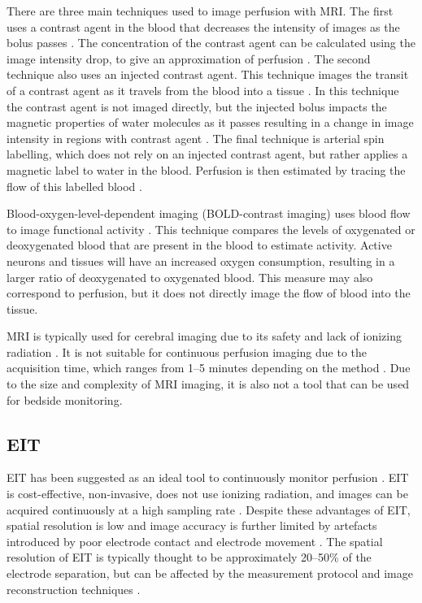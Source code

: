 There are three main techniques used to image perfusion with
MRI. The first uses a contrast agent in the blood that 
decreases the intensity
of  
images as the bolus passes \parencite{jackson_dynamic_2005}.  
The concentration of the contrast agent 
can be calculated using the image intensity drop, to give
an approximation of 
perfusion \parencite{jackson_dynamic_2005}. 
The second technique also uses an injected contrast
agent. This technique images the transit of a contrast agent as it travels 
from the blood into a tissue \parencite{sourbron_classic_2013}. In this technique the contrast
agent is not imaged directly, but the injected bolus impacts the magnetic properties of 
water molecules as it passes resulting in a change in image intensity in regions 
with contrast agent \parencite{sourbron_classic_2013}. 
The final technique is arterial spin labelling, which does not rely on 
an injected contrast agent, but rather applies a  magnetic label to water 
in the blood. Perfusion is then estimated by tracing the flow of this labelled 
blood \parencite{koretsky_early_2012}. 

Blood-oxygen-level-dependent imaging (BOLD-contrast imaging) uses blood flow to 
image functional activity \parencite{faro_functional_2006}.
This technique compares the levels of oxygenated or deoxygenated blood
that are present in the blood to estimate activity. 
Active neurons and tissues will have an increased oxygen consumption, 
resulting in a larger ratio of deoxygenated to oxygenated blood. 
This measure may also correspond to perfusion, but it does not directly image the 
flow of blood into the tissue.

MRI is typically used for cerebral imaging due to its safety and 
lack of ionizing radiation \parencite{watson_lessons_2015}. It is not suitable for 
continuous perfusion imaging due to the acquisition time, which
ranges from 1--5 minutes depending on the method \parencite{essig_perfusion_2013}.
Due to the size and complexity of MRI imaging, it is also not a tool that can be used
for bedside monitoring.

\subsection{EIT}
EIT has been suggested as an ideal tool to continuously monitor 
perfusion \parencite{leonhardt_electrical_2012}. EIT is cost-effective,
non-invasive, does not use ionizing radiation, and images can be acquired 
continuously at a high sampling rate \parencite{adler_electrical_2017}.
Despite these advantages of EIT, 
spatial resolution is low and image accuracy is further limited by 
artefacts introduced by poor electrode contact and electrode 
movement \parencite{adler_electrical_2017}.
The spatial resolution of EIT is typically thought to be approximately 20--50\% 
of the electrode separation, but can be affected by the measurement protocol 
and image reconstruction techniques \parencite{polydorides_electrode_2002}.

